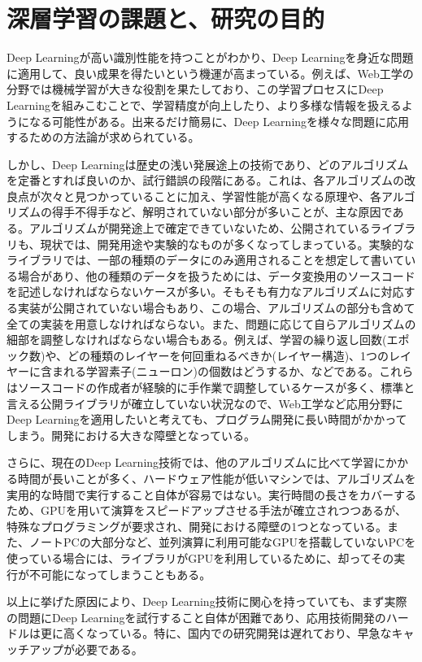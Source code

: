 \section{深層学習の課題と、研究の目的}
Deep Learningが高い識別性能を持つことがわかり、Deep Learningを身近な問題に適用して、良い成果を得たいという機運が高まっている。例えば、Web工学の分野では機械学習が大きな役割を果たしており、この学習プロセスにDeep Learningを組みこむことで、学習精度が向上したり、より多様な情報を扱えるようになる可能性がある。出来るだけ簡易に、Deep Learningを様々な問題に応用するための方法論が求められている。\par
しかし、Deep Learningは歴史の浅い発展途上の技術であり、どのアルゴリズムを定番とすれば良いのか、試行錯誤の段階にある。これは、各アルゴリズムの改良点が次々と見つかっていることに加え、学習性能が高くなる原理や、各アルゴリズムの得手不得手など、解明されていない部分が多いことが、主な原因である。アルゴリズムが開発途上で確定できていないため、公開されているライブラリも、現状では、開発用途や実験的なものが多くなってしまっている。実験的なライブラリでは、一部の種類のデータにのみ適用されることを想定して書いている場合があり、他の種類のデータを扱うためには、データ変換用のソースコードを記述しなければならないケースが多い。そもそも有力なアルゴリズムに対応する実装が公開されていない場合もあり、この場合、アルゴリズムの部分も含めて全ての実装を用意しなければならない。また、問題に応じて自らアルゴリズムの細部を調整しなければならない場合もある。例えば、学習の繰り返し回数(エポック数)や、どの種類のレイヤーを何回重ねるべきか(レイヤー構造)、1つのレイヤーに含まれる学習素子(ニューロン)の個数はどうするか、などである。これらはソースコードの作成者が経験的に手作業で調整しているケースが多く、標準と言える公開ライブラリが確立していない状況なので、Web工学など応用分野にDeep Learningを適用したいと考えても、プログラム開発に長い時間がかかってしまう。開発における大きな障壁となっている。\par
さらに、現在のDeep Learning技術では、他のアルゴリズムに比べて学習にかかる時間が長いことが多く、ハードウェア性能が低いマシンでは、アルゴリズムを実用的な時間で実行すること自体が容易ではない。実行時間の長さをカバーするため、GPUを用いて演算をスピードアップさせる手法が確立されつつあるが、特殊なプログラミングが要求され、開発における障壁の1つとなっている。また、ノートPCの大部分など、並列演算に利用可能なGPUを搭載していないPCを使っている場合には、ライブラリがGPUを利用しているために、却ってその実行が不可能になってしまうこともある。\par
以上に挙げた原因により、Deep Learning技術に関心を持っていても、まず実際の問題にDeep Learningを試行すること自体が困難であり、応用技術開発のハードルは更に高くなっている。特に、国内での研究開発は遅れており、早急なキャッチアップが必要である。\par
